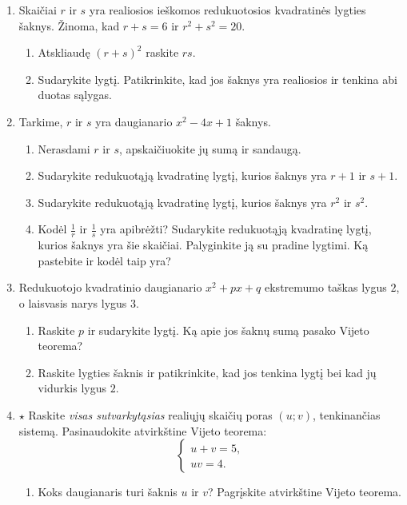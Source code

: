 \documentclass[12pt,a4paper]{article}
\begin{document}
\begin{enumerate}[series=uzdaviniai]
\begin{multicols}{2}
\begin{enumerate}
\end{enumerate}\end{multicols}
Pirmiausia užrašykite vienintelį galimą lygties pavidalą; paskui patikrinkite, kiek jis turi realiųjų šaknų.
\item Skaičiai $r$ ir $s$ yra realiosios ieškomos redukuotosios kvadratinės lygties šaknys. Žinoma, kad $r+s=6$ ir $r^2+s^2=20$.
\begin{enumerate}
\item Atskliaudę $(r+s)^2$ raskite $rs$.
\item Sudarykite lygtį. Patikrinkite, kad jos šaknys yra realiosios ir tenkina abi duotas sąlygas.
\end{enumerate}
\item Tarkime, $r$ ir $s$ yra daugianario $x^2-4x+1$ šaknys.
\begin{enumerate}
\item Nerasdami $r$ ir $s$, apskaičiuokite jų sumą ir sandaugą.
\item Sudarykite redukuotąją kvadratinę lygtį, kurios šaknys yra $r+1$ ir $s+1$.
\item Sudarykite redukuotąją kvadratinę lygtį, kurios šaknys yra $r^2$ ir $s^2$.
\item Kodėl $\frac{1}{r}$ ir $\frac{1}{s}$ yra apibrėžti? Sudarykite redukuotąją kvadratinę lygtį, kurios šaknys yra šie skaičiai. Palyginkite ją su pradine lygtimi. Ką pastebite ir kodėl taip yra?
\end{enumerate}
\needspace{4cm}
\item Redukuotojo kvadratinio daugianario $x^2+px+q$ ekstremumo taškas lygus $2$, o laisvasis narys lygus $3$.
\begin{enumerate}
\item Raskite $p$ ir sudarykite lygtį. Ką apie jos šaknų sumą pasako Vijeto teorema?
\item Raskite lygties šaknis ir patikrinkite, kad jos tenkina lygtį bei kad jų vidurkis lygus $2$.
\end{enumerate}
\needspace{7cm}
\item $\star$ Raskite \emph{visas sutvarkytąsias} realiųjų skaičių poras $(u;v)$, tenkinančias sistemą. Pasinaudokite atvirkštine Vijeto teorema:
\[\begin{cases}u+v=5,\\uv=4.\end{cases}\]
\begin{enumerate}
\item Koks daugianaris turi šaknis $u$ ir $v$? Pagrįskite atvirkštine Vijeto teorema.

\end{enumerate}
\end{enumerate}
\end{document}
